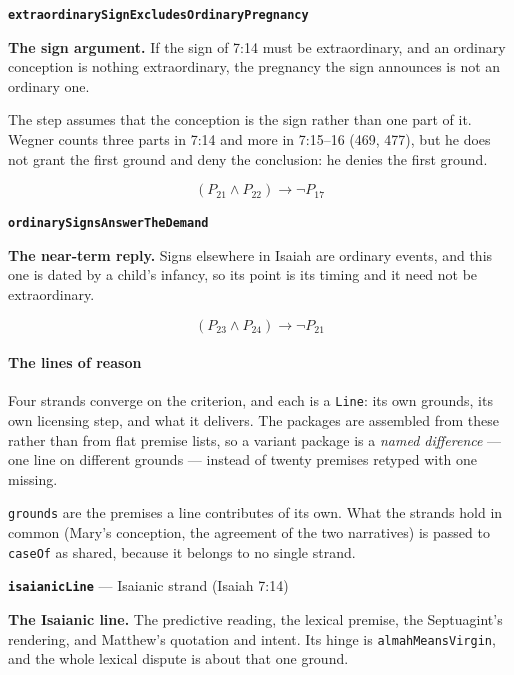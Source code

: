 \documentclass[11pt]{article}
\begin{document}
\par\medskip\noindent\textbf{\texttt{extraordinary\allowbreak{}Sign\allowbreak{}Excludes\allowbreak{}Ordinary\allowbreak{}Pregnancy}}\par\nobreak\noindent
\textbf{The sign argument.} If the sign of 7:14 must be extraordinary, and an ordinary conception is nothing extraordinary, the pregnancy the sign announces is not an ordinary one.

The step assumes that the conception is the sign rather than one part of it. Wegner counts three parts in 7:14 and more in 7:15–16 (469, 477), but he does not grant the first ground and deny the conclusion: he denies the first ground.

\[(P_{21} \land P_{22}) \rightarrow \lnot P_{17}\]
\par\medskip\noindent\textbf{\texttt{ordinary\allowbreak{}Signs\allowbreak{}Answer\allowbreak{}The\allowbreak{}Demand}}\par\nobreak\noindent
\textbf{The near-term reply.} Signs elsewhere in Isaiah are ordinary events, and this one is dated by a child's infancy, so its point is its timing and it need not be extraordinary.

\[(P_{23} \land P_{24}) \rightarrow \lnot P_{21}\]
\paragraph*{The lines of reason}
\leavevmode\par
Four strands converge on the criterion, and each is a \texttt{Line}: its own grounds, its own licensing step, and what it delivers. The packages are assembled from these rather than from flat premise lists, so a variant package is a \emph{named difference} — one line on different grounds — instead of twenty premises retyped with one missing.

\texttt{grounds} are the premises a line contributes of its own. What the strands hold in common (Mary's conception, the agreement of the two narratives) is passed to \texttt{case\allowbreak{}Of} as shared, because it belongs to no single strand.

\par\medskip\noindent\textbf{\texttt{isaianic\allowbreak{}Line}} --- Isaianic strand (Isaiah 7:14)\par\nobreak\noindent
\textbf{The Isaianic line.} The predictive reading, the lexical premise, the Septuagint's rendering, and Matthew's quotation and intent. Its hinge is \texttt{almah\allowbreak{}Means\allowbreak{}Virgin}, and the whole lexical dispute is about that one ground.
\end{document}
